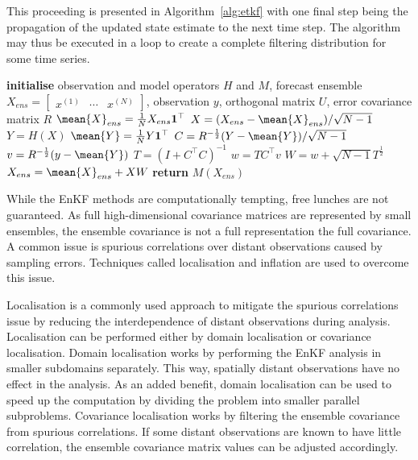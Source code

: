 This proceeding is presented in Algorithm~\ref{alg:etkf} with one final step being the propagation of the updated state estimate to the next time step.
The algorithm may thus be executed in a loop to create a complete filtering distribution for some time series.

\begin{algorithm}[H]
    \caption{\label{alg:etkf}Ensemble transform Kalman filter (ETKF)}
    \begin{algorithmic}[1]
        \State\textbf{initialise} observation and model operators $H$ and $M$, forecast ensemble $X_{ens}=\begin{bmatrix} x^{(1)} & \cdots & x^{(N)} \end{bmatrix}$, observation $y$, orthogonal matrix $U$, error covariance matrix $R$  
        \State $\mean{X}_{ens} = \frac{1}{N}X_{ens} \mathbf{1}^{\top}$
        \State $X = (X_{ens} -  \mean{X}_{ens}) / \sqrt{N-1}$
        \State $Y = H(X)$
        \State $\mean{Y} =  \frac{1}{N} Y \mathbf{1}^{\top}$
        \State $C = R^{-\frac{1}{2}}(Y - \mean{Y}) / \sqrt{N-1}$
        \State $v = R^{-\frac{1}{2}}(y - \mean{Y})$
        \State $T = (I + C^{\top}C)^{-1}$
        \State $w = T C^{\top} v$
        \State $W = w + \sqrt{N-1} T^{\frac{1}{2}}$
        \State $X_{ens} = \mean{X}_{ens} + XW$
        \State\textbf{return} $M(X_{ens})$
    \end{algorithmic}
\end{algorithm}

While the EnKF methods are computationally tempting, free lunches are not guaranteed.
As full high-dimensional covariance matrices are represented by small ensembles, the ensemble covariance is not a full representation the full covariance.
A common issue is spurious correlations over distant observations caused by sampling errors.
Techniques called localisation and inflation are used to overcome this issue.

Localisation is a commonly used approach to mitigate the spurious correlations issue by reducing the interdependence of distant observations during analysis.
Localisation can be performed either by domain localisation or covariance localisation.
Domain localisation works by performing the EnKF analysis in smaller subdomains separately.
This way, spatially distant observations have no effect in the analysis.
As an added benefit, domain localisation can be used to speed up the computation by dividing the problem into smaller parallel subproblems.
Covariance localisation works by filtering the ensemble covariance from spurious correlations.
If some distant observations are known to have little correlation, the ensemble covariance matrix values can be adjusted accordingly.


